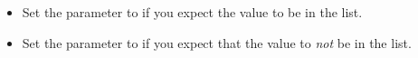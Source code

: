 \begin{itemize}
\item Set the parameter to \gdrefbooleantrue{} if you expect the value to be in the list. 
\item Set the parameter to \gdrefbooleanfalse{} if you expect that the value to \emph{not} be in the list.
\end{itemize}

    